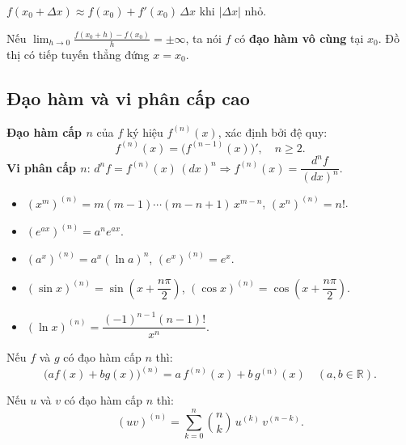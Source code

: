 \documentclass[12pt,a4paper]{article}
\begin{document}
\begin{congthuc}[title={Ứng dụng vi phân: tính gần đúng}]
  $f(x_0 + \Delta x) \approx f(x_0) + f'(x_0)\,\Delta x$ khi $|\Delta x|$ nhỏ.
\end{congthuc}

\begin{dinhnghia}[title={Đạo hàm vô cùng}]
  Nếu $\displaystyle\lim_{h \to 0}\frac{f(x_0 + h) - f(x_0)}{h} = \pm\infty$, ta nói $f$ có \textbf{đạo hàm vô cùng} tại $x_0$. Đồ thị có tiếp tuyến thẳng đứng $x = x_0$.
\end{dinhnghia}

\subsection{Đạo hàm và vi phân cấp cao}

\begin{dinhnghia}
  \textbf{Đạo hàm cấp $n$} của $f$ ký hiệu $f^{(n)}(x)$, xác định bởi đệ quy:
  \[
    f^{(n)}(x) = \bigl(f^{(n-1)}(x)\bigr)', \quad n \ge 2.
  \]
  \textbf{Vi phân cấp $n$}: $d^n f = f^{(n)}(x)\,(dx)^n \Rightarrow f^{(n)}(x) = \dfrac{d^nf}{(dx)^n}$.
\end{dinhnghia}

\begin{congthuc}[title={Đạo hàm cấp $n$ thường gặp}]
  \begin{itemize}
    \item $(x^m)^{(n)} = m(m-1)\cdots(m-n+1)\,x^{m-n}$, \;$(x^n)^{(n)} = n!$.
    \item $(e^{ax})^{(n)} = a^n e^{ax}$.
    \item $(a^x)^{(n)} = a^x (\ln a)^n$, $(e^x)^{(n)} = e^x$.
    \item $(\sin x)^{(n)} = \sin\!\left(x + \dfrac{n\pi}{2}\right)$, \;$(\cos x)^{(n)} = \cos\!\left(x + \dfrac{n\pi}{2}\right)$.
    \item $(\ln x)^{(n)} = \dfrac{(-1)^{n-1}(n-1)!}{x^n}$.
  \end{itemize}
\end{congthuc}

\begin{tinhchat}[title={Tính tuyến tính của đạo hàm cấp cao}]
  Nếu $f$ và $g$ có đạo hàm cấp $n$ thì:
  \[
    \bigl(af(x) + bg(x)\bigr)^{(n)} = a\,f^{(n)}(x) + b\,g^{(n)}(x) \quad (a, b \in \mathbb{R}).
  \]
\end{tinhchat}

\begin{dinhly}[title={Công thức Leibniz}]
  Nếu $u$ và $v$ có đạo hàm cấp $n$ thì:
  \[
    (uv)^{(n)} = \sum_{k=0}^{n} \binom{n}{k}\, u^{(k)}\, v^{(n-k)}.
  \]
\end{dinhly}
\end{document}
